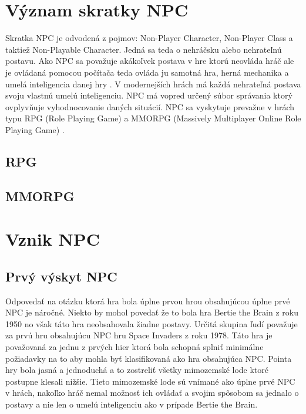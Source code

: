\documentclass[10pt,twoside,slovak,a4paper]{article}
\begin{document}
\section{Význam skratky NPC}  \label{Vyznam skratky}
Skratka NPC je odvodená z pojmov: Non-Player Character, Non-Player Class a taktiež Non-Playable Character. Jedná sa teda o nehráčsku alebo nehrateľnú postavu. Ako NPC sa považuje akákoľvek postava v hre ktorú neovláda hráč ale je ovládaná pomocou počítača teda ovláda ju samotná hra, herná mechanika a umelá inteligencia danej hry \cite{Hack2018}. V modernejších hrách má každá nehrateľná postava svoju vlastnú umelú inteligenciu. NPC má vopred určený súbor správania ktorý ovplyvňuje vyhodnocovanie daných situácií. NPC sa vyskytuje prevažne v hrách typu RPG (Role Playing Game) a MMORPG (Massively Multiplayer Online Role Playing Game) \cite{9291553}.

\subsection{RPG} \label{RPG}
\subsection{MMORPG} \label{MMORPG}



\section{Vznik NPC}    \label{Vznik}
\subsection{Prvý výskyt NPC} \label{NPC 1 time}
Odpovedať na otázku ktorá hra bola úplne prvou hrou obsahujúcou úplne prvé NPC je náročné. Niekto by mohol povedať že to bola hra Bertie the Brain z roku 1950 no však táto hra neobsahovala žiadne postavy. Určitá skupina ľudí považuje za prvú hru obsahujúcu NPC hru Space Invaders z roku 1978. Táto hra je považovaná za jednu z prvých hier ktorá bola schopná splniť minimálne požiadavky na to aby mohla byť klasifikovaná ako hra obsahujúca NPC. Pointa hry bola jasná a jednoduchá a to zostreliť všetky mimozemské lode ktoré postupne klesali nižšie. Tieto mimozemské lode sú vnímané ako úplne prvé NPC v hrách, nakoľko hráč nemal možnosť ich ovládať a svojim spôsobom sa jednalo o postavy a nie len o umelú inteligenciu ako v prípade Bertie the Brain. %
\end{document}
